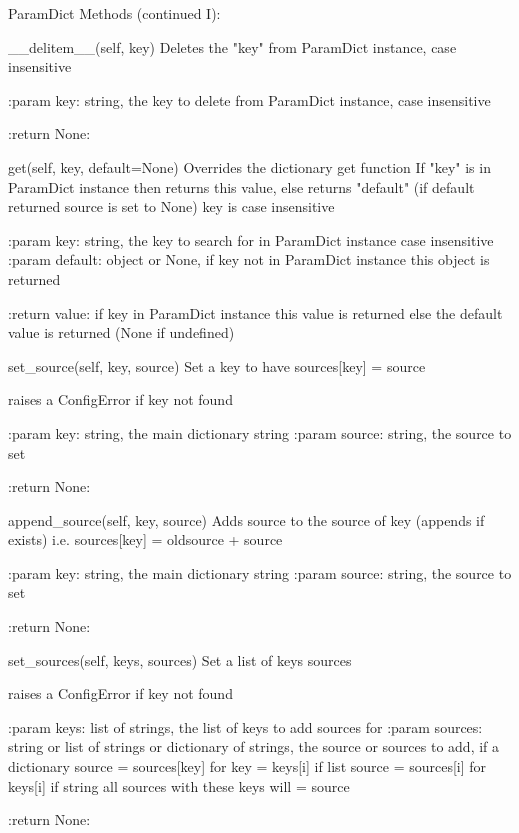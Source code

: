 \begin{minipage}{\textwidth}
\begin{pythondocstring}
ParamDict Methods (continued I):

	__delitem__(self, key)
	        Deletes the "key" from ParamDict instance, case insensitive

	        :param key: string, the key to delete from ParamDict instance,
	                    case insensitive

	        :return None:

	get(self, key, default=None)
	        Overrides the dictionary get function
	        If "key" is in ParamDict instance then returns this value, else
	        returns "default" (if default returned source is set to None)
	        key is case insensitive

	        :param key: string, the key to search for in ParamDict instance
	                    case insensitive
	        :param default: object or None, if key not in ParamDict instance this
	                        object is returned

	        :return value: if key in ParamDict instance this value is returned else
	                       the default value is returned (None if undefined)

	set_source(self, key, source)
	        Set a key to have sources[key] = source

	        raises a ConfigError if key not found

	        :param key: string, the main dictionary string
	        :param source: string, the source to set

	        :return None:

	append_source(self, key, source)
	        Adds source to the source of key (appends if exists)
	        i.e. sources[key] = oldsource + source

	        :param key: string, the main dictionary string
	        :param source: string, the source to set

	        :return None:

	set_sources(self, keys, sources)
	        Set a list of keys sources

	        raises a ConfigError if key not found

	        :param keys: list of strings, the list of keys to add sources for
	        :param sources: string or list of strings or dictionary of strings,
	                        the source or sources to add,
	                        if a dictionary source = sources[key] for key = keys[i]
	                        if list source = sources[i]  for keys[i]
	                        if string all sources with these keys will = source

	        :return None:
\end{pythondocstring}
\end{minipage}

